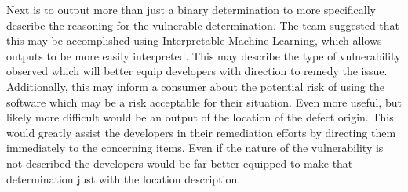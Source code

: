 \documentclass[]{article}
\begin{document}
Next is to output more than just a binary determination to more specifically describe the reasoning for the vulnerable determination.
The team suggested that this may be accomplished using Interpretable Machine Learning, which allows outputs to be more easily interpreted.
This may describe the type of vulnerability observed which will better equip developers with direction to remedy the issue.
Additionally, this may inform a consumer about the potential risk of using the software which may be a risk acceptable for their situation.
Even more useful, but likely more difficult would be an output of the location of the defect origin.
This would greatly assist the developers in their remediation efforts by directing them immediately to the concerning items.
Even if the nature of the vulnerability is not described the developers would be far better equipped to make that determination just with the location description.


\clearpage


\end{document}
